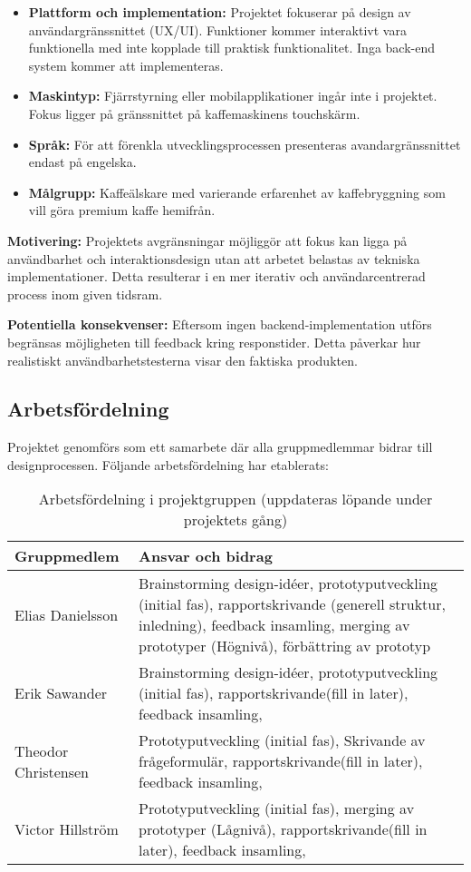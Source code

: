 \begin{itemize}
    
    \item \textbf{Plattform och implementation:} Projektet fokuserar på design av användargränssnittet (UX/UI). Funktioner kommer interaktivt vara funktionella med inte kopplade till praktisk funktionalitet. Inga back-end system kommer att implementeras.

    \item \textbf{Maskintyp:} Fjärrstyrning eller mobilapplikationer ingår inte i projektet. Fokus ligger på gränssnittet på kaffemaskinens touchskärm.

    \item \textbf{Språk:} För att förenkla utvecklingsprocessen presenteras avandargränssnittet endast på engelska.

    \item \textbf{Målgrupp:} Kaffeälskare med varierande erfarenhet av kaffebryggning som vill göra premium kaffe hemifrån.


\end{itemize}

\textbf{Motivering:} Projektets avgränsningar möjliggör att fokus kan ligga på användbarhet och interaktionsdesign utan att arbetet belastas av tekniska implementationer. Detta resulterar i en mer iterativ och användarcentrerad process inom given tidsram. 

\textbf{Potentiella konsekvenser:} Eftersom ingen backend-implementation utförs begränsas möjligheten till feedback kring responstider. Detta påverkar hur realistiskt användbarhetstesterna visar den faktiska produkten. 


\subsection{Arbetsfördelning}

Projektet genomförs som ett samarbete där alla gruppmedlemmar bidrar till designprocessen. Följande arbetsfördelning har etablerats:

\begin{table}[h]
\centering
\begin{tabular}{|l|p{9cm}|}
\hline
\textbf{Gruppmedlem} & \textbf{Ansvar och bidrag} \\
\hline
Elias Danielsson & Brainstorming design-idéer, prototyputveckling (initial fas), rapportskrivande (generell struktur, inledning), feedback insamling, merging av prototyper (Högnivå), förbättring av prototyp \\
\hline
Erik Sawander & Brainstorming design-idéer, prototyputveckling (initial fas), rapportskrivande(fill in later), feedback insamling, \\
\hline
Theodor Christensen & Prototyputveckling (initial fas), Skrivande av frågeformulär, rapportskrivande(fill in later), feedback insamling, \\
\hline
Victor Hillström & Prototyputveckling (initial fas), merging av prototyper (Lågnivå), rapportskrivande(fill in later), feedback insamling, \\
\hline
\end{tabular}
\caption{Arbetsfördelning i projektgruppen (uppdateras löpande under projektets gång)}
\end{table}
